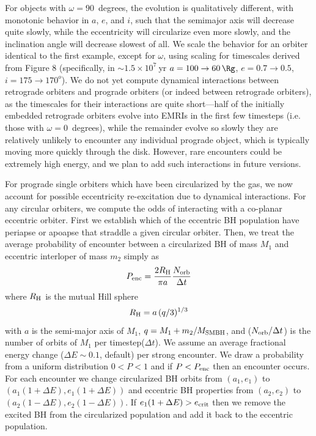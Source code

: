 For objects with $\omega=90$~degrees, the evolution is qualitatively different, with monotonic behavior in $a$, $e$, and $i$, such that the semimajor axis will decrease quite slowly, while the eccentricity will circularize even more slowly, and the inclination angle will decrease slowest of all.
We scale the behavior for an orbiter identical to the first example, except for $\omega$, using scaling for timescales derived from \cite{WangZhuLin24} Figure 8 (specifically, in $\sim1.5 \times10^7~$yr $a=100\rightarrow60\,\Rg$, $e=0.7\rightarrow0.5$, $i=175\rightarrow170^{o}$).
We do not yet compute dynamical interactions between retrograde orbiters and prograde orbiters (or indeed between retrograde orbiters), as the timescales for their interactions are quite short---half of the initially embedded retrograde orbiters evolve into EMRIs in the first few timesteps (i.e. those with $\omega=0$~degrees), while the remainder evolve so slowly they are relatively unlikely to encounter any individual prograde object, which is typically moving more quickly through the disk.
However, rare encounters could be extremely high energy, and we plan to add such interactions in future versions.

For prograde single orbiters which have been circularized by the gas, we now account for possible eccentricity re-excitation due to dynamical interactions.
For any circular orbiters, we compute the odds of interacting with a co-planar eccentric orbiter.
First we establish which of the eccentric BH population have periapse or apoapse that straddle a given circular orbiter.
Then, we treat the average probability of encounter between a circularized BH of mass $M_{1}$ and eccentric interloper of mass $m_{2}$ simply as 
\begin{equation}
P_{\rm enc}=\frac{2R_\mathrm{H}}{\pi a}\frac{N_{\rm orb}}{\Delta t}
\end{equation}
where $R_{\rm H}$ is the mutual Hill sphere 
\begin{equation}
    R_{\rm H} = a\, (q/3)^{1/3}
\end{equation}
 with $a$ is the semi-major axis of $M_{1}$, $q=M_{1}+m_{2}/M_{\rm SMBH}$, and ($N_{\rm orb}/\Delta t$) is the number of orbits of $M_{1}$ per timestep($\Delta t$).
We assume an average fractional energy change ($\Delta E \sim 0.1$, default) per strong encounter.
We draw a probability from a uniform distribution $0<P<1$ and if $P<P_{\rm enc}$ then an encounter occurs. For each encounter we change circularized BH orbits from $(a_{1},e_{1})$ to $(a_{1}(1+\Delta E),e_{1}(1+\Delta E))$ and eccentric BH properties from $(a_{2},e_{2})$ to $(a_{2}(1-\Delta E),e_{2}(1-\Delta E))$.
If $e_{1}(1+\Delta E)>e_{\rm crit}$ then we remove the excited BH from the circularized population and add it back to the eccentric population.



